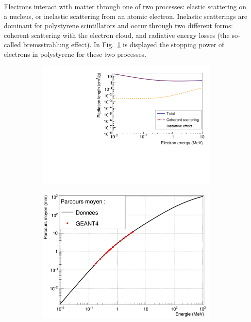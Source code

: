 Electrons interact with matter through one of two processes: elastic scattering on a nucleus, or inelastic scattering from an atomic electron.
Inelastic scatterings are dominant for polystyrene scintillators and occur through two different forms: coherent scattering with the electron cloud, and radiative energy losses (the so-called bremsstrahlung effect).
In Fig.~\ref{subfig:electron_attenuation} is displayed the stopping power of electrons in polystyrene for these two processes.
\begin{figure}[h]
  \centering
  \begin{subfigure}[t]{0.48\textwidth}
    \centering
    \includegraphics[width=1\textwidth]{commissioning/fig_commissioning/electron_energy_loss.pdf}
    \captionsetup{justification=centering}
    \caption{
      \label{subfig:electron_attenuation}}
  \end{subfigure}
  \hfill
  \begin{subfigure}[t]{0.48\textwidth}
    \centering
    \includegraphics[width=1\textwidth]{commissioning/fig_commissioning/free_path_electrons.pdf}

\end{subfigure}
\end{figure}
